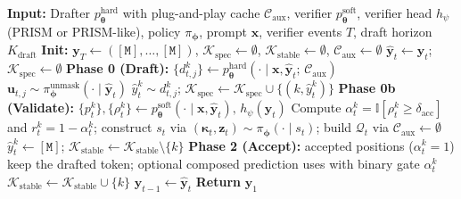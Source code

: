 \documentclass[11pt]{article}
\newcommand{\cK}{\mathcal{K}}
\newcommand{\cQ}{\mathcal{Q}}
\newcommand{\cC}{\mathcal{C}}
\newcommand{\btheta}{\bm{\theta}}
\newcommand{\bphi}{\bm{\phi}}
\newcommand{\bx}{\mathbf{x}}
\newcommand{\by}{\mathbf{y}}
\newcommand{\bu}{\mathbf{u}}
\newcommand{\ind}{\mathbb{I}}
\newcommand{\mask}{\ensuremath{\mathtt{[M]}}}
\begin{document}
\begin{algorithm}[t]
\caption{\textbf{Main Algorithm:} AOAE Lossy Draft--Validate Inference}
\label{alg:aoae}
\begin{algorithmic}[1]
\State \textbf{Input:} Drafter $p_{\btheta}^{\text{hard}}$ with plug-and-play cache $\cC_{\text{aux}}$, verifier $p_{\btheta}^{\text{soft}}$, verifier head $h_\psi$ (PRISM or PRISM-like), policy $\pi_{\bphi}$, prompt $\bx$, verifier events $T$, draft horizon $K_{\text{draft}}$
\State \textbf{Init:} $\by_T \leftarrow (\mask, \dots, \mask)$, \; $\cK_{\text{spec}} \leftarrow \emptyset$, \; $\cK_{\text{stable}} \leftarrow \emptyset$, \; $\cC_{\text{aux}} \leftarrow \emptyset$
    \State $\hat{\by}_t \leftarrow \by_t$; \; $\cK_{\text{spec}} \leftarrow \emptyset$
        \State \textbf{Phase 0 (Draft):} $\{d_{t,j}^k\} \leftarrow p_{\btheta}^{\text{hard}}(\cdot \mid \bx, \hat{\by}_t;\, \cC_{\text{aux}})$ 
        \State $\bu_{t,j} \sim \pi_{\bphi}^{\text{unmask}}(\cdot \mid \hat{\by}_t)$ 
        \For{$k : u_{t,j}^k {=} 1,\, \hat{y}_t^k {=} \mask$}
            \State $\hat{y}_t^k \sim d_{t,j}^k$; \; $\cK_{\text{spec}} \leftarrow \cK_{\text{spec}} \cup \{(k, \hat{y}_t^k)\}$
        \EndFor
    \EndFor
    \State \textbf{Phase 0b (Validate):} $\{p_t^k\}, \{\rho_t^k\} \leftarrow p_{\btheta}^{\text{soft}}(\cdot \mid \bx, \hat{\by}_t),\, h_\psi(\hat{\by}_t)$ 
    \State Compute $\alpha_t^k = \ind[\rho_t^k \ge \delta_{\text{acc}}]$ and $r_t^k = 1 - \alpha_t^k$; construct $s_t$ via 
    \State $(\bm{\kappa}_t, \mathbf{z}_t) \sim \pi_{\bphi}(\cdot \mid s_t)$; build $\cQ_t$ via 
        \State $\cC_{\text{aux}} \leftarrow \emptyset$ 
    \EndIf
    \For{$k : r_t^k {=} 1,\, \hat{y}_t^k \neq \mask$} 
        \State $\hat{y}_t^k \leftarrow \mask$; \; $\cK_{\text{stable}} \leftarrow \cK_{\text{stable}} \setminus \{k\}$
    \EndFor
    \State \textbf{Phase 2 (Accept):} accepted positions ($\alpha_t^k = 1$) keep the drafted token; optional composed prediction uses  with binary gate $\alpha_t^k$
     
        \State $\cK_{\text{stable}} \leftarrow \cK_{\text{stable}} \cup \{k\}$
    \EndFor
    \State $\by_{t-1} \leftarrow \hat{\by}_t$
\EndFor
\State \textbf{Return} $\by_1$
\end{algorithmic}
\end{algorithm}
\end{document}

